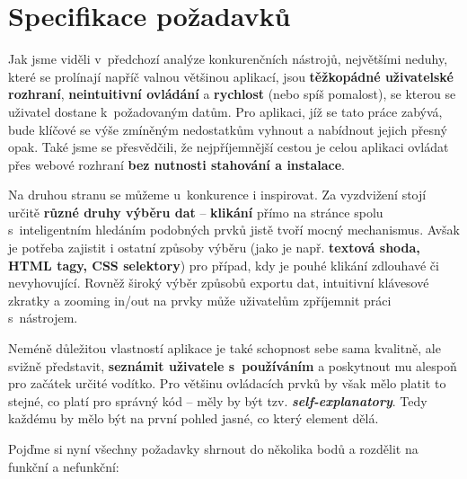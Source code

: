 \documentclass[thesis=B,czech]{FITthesis}[2012/06/26]
\begin{document}

\newpage
\section{Specifikace požadavků}
Jak jsme viděli v~předchozí analýze konkurenčních nástrojů, největšími neduhy, které se prolínají napříč valnou většinou aplikací, jsou \textbf{těžkopádné uživatelské rozhraní}, \textbf{neintuitivní ovládání} a \textbf{rychlost} (nebo spíš pomalost), se kterou se uživatel dostane k~požadovaným datům. Pro aplikaci, jíž se tato práce zabývá, bude klíčové se výše zmíněným nedostatkům vyhnout a nabídnout jejich přesný opak. Také jsme se přesvědčili, že nejpříjemnější cestou je celou aplikaci ovládat přes webové rozhraní  \textbf{bez nutnosti stahování a instalace}.

Na druhou stranu se můžeme u~konkurence i inspirovat. Za vyzdvižení stojí určitě \textbf{různé druhy výběru dat} -- \textbf{klikání} přímo na stránce spolu s~inteligentním hledáním podobných prvků jistě tvoří mocný mechanismus. Avšak je potřeba zajistit i ostatní způsoby výběru (jako je např. \textbf{textová shoda, HTML tagy, CSS selektory}) pro případ, kdy je pouhé klikání zdlouhavé či nevyhovující. Rovněž široký výběr způsobů exportu dat, intuitivní klávesové zkratky a zooming in/out na prvky může uživatelům zpříjemnit práci s~nástrojem.

Neméně důležitou vlastností aplikace je také schopnost sebe sama kvalitně, ale svižně představit, \textbf{seznámit uživatele s~používáním} a poskytnout mu alespoň pro začátek určité vodítko. Pro většinu ovládacích prvků by však mělo platit to stejné, co platí pro správný kód -- měly by být tzv. \textbf{\emph{self-explanatory}}. Tedy každému by mělo být na první pohled jasné, co který element dělá.

Pojďme si nyní všechny požadavky shrnout do několika bodů a rozdělit na funkční a nefunkční:
\end{document}
